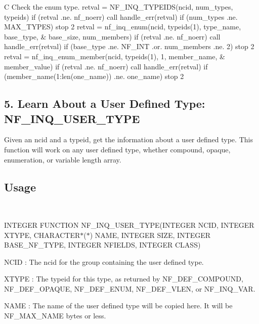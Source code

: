 C Check the enum type. retval = N\+F\+\_\+\+I\+N\+Q\+\_\+\+T\+Y\+P\+E\+I\+D\+S(ncid, num\+\_\+types, typeids) if (retval .ne. nf\+\_\+noerr) call handle\+\_\+err(retval) if (num\+\_\+types .ne. M\+A\+X\+\_\+\+T\+Y\+P\+ES) stop 2 retval = nf\+\_\+inq\+\_\+enum(ncid, typeids(1), type\+\_\+name, base\+\_\+type, \& base\+\_\+size, num\+\_\+members) if (retval .ne. nf\+\_\+noerr) call handle\+\_\+err(retval) if (base\+\_\+type .ne. N\+F\+\_\+\+I\+NT .or. num\+\_\+members .ne. 2) stop 2 retval = nf\+\_\+inq\+\_\+enum\+\_\+member(ncid, typeids(1), 1, member\+\_\+name, \& member\+\_\+value) if (retval .ne. nf\+\_\+noerr) call handle\+\_\+err(retval) if (member\+\_\+name(1\+:len(one\+\_\+name)) .ne. one\+\_\+name) stop 2\hypertarget{nc_f77_interface_guide_f77_NF-INQ-USER-TYPE}{}\subsection{5. Learn About a User Defined Type\+: N\+F\+\_\+\+I\+N\+Q\+\_\+\+U\+S\+E\+R\+\_\+\+T\+Y\+P\+E }\label{nc_f77_interface_guide_f77_NF-INQ-USER-TYPE}
Given an ncid and a typeid, get the information about a user defined type. This function will work on any user defined type, whether compound, opaque, enumeration, or variable length array.

\subsection*{Usage }

 

I\+N\+T\+E\+G\+ER F\+U\+N\+C\+T\+I\+ON N\+F\+\_\+\+I\+N\+Q\+\_\+\+U\+S\+E\+R\+\_\+\+T\+Y\+PE(I\+N\+T\+E\+G\+ER N\+C\+ID, I\+N\+T\+E\+G\+ER X\+T\+Y\+PE, C\+H\+A\+R\+A\+C\+T\+E\+R$\ast$($\ast$) N\+A\+ME, I\+N\+T\+E\+G\+ER S\+I\+ZE, I\+N\+T\+E\+G\+ER B\+A\+S\+E\+\_\+\+N\+F\+\_\+\+T\+Y\+PE, I\+N\+T\+E\+G\+ER N\+F\+I\+E\+L\+DS, I\+N\+T\+E\+G\+ER C\+L\+A\+SS)

{\ttfamily N\+C\+ID} \+: The ncid for the group containing the user defined type.

{\ttfamily X\+T\+Y\+PE} \+: The typeid for this type, as returned by N\+F\+\_\+\+D\+E\+F\+\_\+\+C\+O\+M\+P\+O\+U\+ND, N\+F\+\_\+\+D\+E\+F\+\_\+\+O\+P\+A\+Q\+UE, N\+F\+\_\+\+D\+E\+F\+\_\+\+E\+N\+UM, N\+F\+\_\+\+D\+E\+F\+\_\+\+V\+L\+EN, or N\+F\+\_\+\+I\+N\+Q\+\_\+\+V\+AR.

{\ttfamily N\+A\+ME} \+: The name of the user defined type will be copied here. It will be N\+F\+\_\+\+M\+A\+X\+\_\+\+N\+A\+ME bytes or less.

